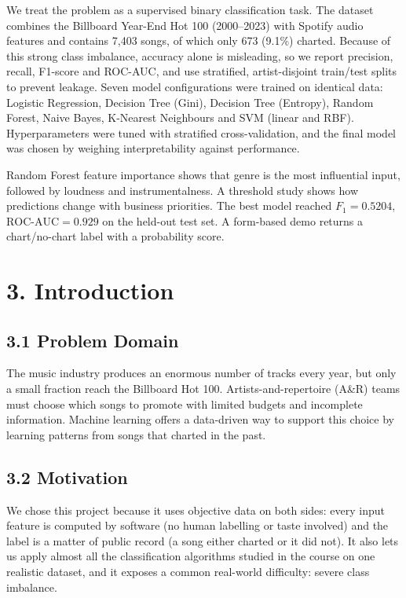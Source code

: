 \documentclass[11pt,a4paper]{article}
\begin{document}
We treat the problem as a supervised binary classification task. The dataset combines the Billboard Year-End Hot 100 (2000--2023) with Spotify audio features and contains 7,403 songs, of which only 673 (9.1\%) charted. Because of this strong class imbalance, accuracy alone is misleading, so we report precision, recall, F1-score and ROC-AUC, and use stratified, artist-disjoint train/test splits to prevent leakage. Seven model configurations were trained on identical data: Logistic Regression, Decision Tree (Gini), Decision Tree (Entropy), Random Forest, Naive Bayes, K-Nearest Neighbours and SVM (linear and RBF). Hyperparameters were tuned with stratified cross-validation, and the final model was chosen by weighing interpretability against performance.

Random Forest feature importance shows that genre is the most influential input, followed by loudness and instrumentalness. A threshold study shows how predictions change with business priorities. The best model reached $F_1 = 0.5204$, $\text{ROC-AUC} = 0.929$ on the held-out test set. A form-based demo returns a chart/no-chart label with a probability score.

\section*{3. Introduction}
\subsection*{3.1 Problem Domain}
The music industry produces an enormous number of tracks every year, but only a small fraction reach the Billboard Hot 100. Artists-and-repertoire (A\&R) teams must choose which songs to promote with limited budgets and incomplete information. Machine learning offers a data-driven way to support this choice by learning patterns from songs that charted in the past.

\subsection*{3.2 Motivation}
We chose this project because it uses objective data on both sides: every input feature is computed by software (no human labelling or taste involved) and the label is a matter of public record (a song either charted or it did not). It also lets us apply almost all the classification algorithms studied in the course on one realistic dataset, and it exposes a common real-world difficulty: severe class imbalance.
\end{document}
